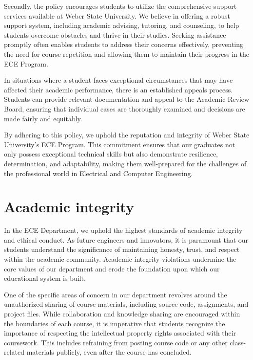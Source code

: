 Secondly, the policy encourages students to utilize the comprehensive support services available at Weber State University. We believe in offering a robust support system, including academic advising, tutoring, and counseling, to help students overcome obstacles and thrive in their studies. Seeking assistance promptly often enables students to address their concerns effectively, preventing the need for course repetition and allowing them to maintain their progress in the ECE Program.

In situations where a student faces exceptional circumstances that may have affected their academic performance, there is an established appeals process. Students can provide relevant documentation and appeal to the Academic Review Board, ensuring that individual cases are thoroughly examined and decisions are made fairly and equitably.

By adhering to this policy, we uphold the reputation and integrity of Weber State University's ECE Program. This commitment ensures that our graduates not only possess exceptional technical skills but also demonstrate resilience, determination, and adaptability, making them well-prepared for the challenges of the professional world in Electrical and Computer Engineering.


\section{Academic integrity}
\label{sec:academic-integrity}

In the ECE Department, we uphold the highest standards of academic integrity and ethical conduct. As future engineers and innovators, it is paramount that our students understand the significance of maintaining honesty, trust, and respect within the academic community. Academic integrity violations undermine the core values of our department and erode the foundation upon which our educational system is built.

One of the specific areas of concern in our department revolves around the unauthorized sharing of course materials, including source code, assignments, and project files. While collaboration and knowledge sharing are encouraged within the boundaries of each course, it is imperative that students recognize the importance of respecting the intellectual property rights associated with their coursework. This includes refraining from posting course code or any other class-related materials publicly, even after the course has concluded.

